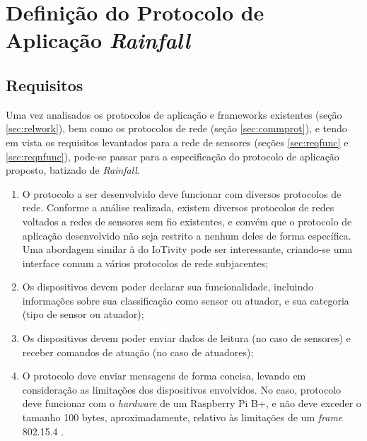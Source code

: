 
\section{Definição do Protocolo de Aplicação \textit{Rainfall}}
\subsection{Requisitos} \label{subsec:requisitos}
Uma vez analisados os protocolos de aplicação e frameworks existentes (seção \ref{sec:relwork}), bem como os protocolos de rede (seção \ref{sec:commprot}), e tendo em vista os requisitos levantados para a rede de sensores (seções \ref{sec:reqfunc} e \ref{sec:reqnfunc}), pode-se passar para a especificação do protocolo de aplicação proposto, batizado de \textit{Rainfall}.

\begin{enumerate}[\quad R1.]
	\item O protocolo a ser desenvolvido deve funcionar com diversos protocolos de rede. Conforme a análise realizada, existem diversos protocolos de redes voltados a redes de sensores sem fio existentes, e convém que o protocolo de aplicação desenvolvido não seja restrito a nenhum deles de forma específica. Uma abordagem similar à do IoTivity pode ser interessante, criando-se uma interface comum a vários protocolos de rede subjacentes;
	\item Os dispositivos devem poder declarar sua funcionalidade, incluindo informações sobre sua classificação como sensor ou atuador, e sua categoria (tipo de sensor ou atuador);
	\item Os dispositivos devem poder enviar dados de leitura (no caso de sensores) e receber comandos de atuação (no caso de atuadores);
	\item O protocolo deve enviar mensagens de forma concisa, levando em consideração as limitações dos dispositivos envolvidos. No caso, protocolo deve funcionar com o \textit{hardware} de um Raspberry Pi B+, e não deve exceder o tamanho 100 bytes, aproximadamente, relativo às limitações de um \textit{frame} 802.15.4\cite{devadiga} .
\end{enumerate}

